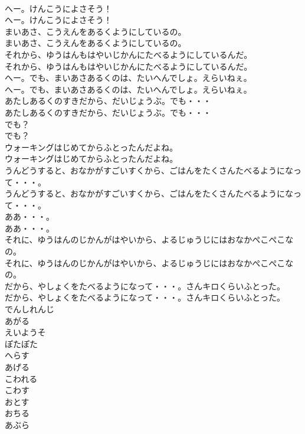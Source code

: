 \documentclass[8pt]{extreport}
\begin{document}
\begin{CJK}{UTF8}{min}
\\	へー。けんこうによさそう！	
\\	へー。けんこうによさそう！ 
\\	まいあさ、こうえんをあるくようにしているの。	
\\	まいあさ、こうえんをあるくようにしているの。 
\\	それから、ゆうはんもはやいじかんにたべるようにしているんだ。	
\\	それから、ゆうはんもはやいじかんにたべるようにしているんだ。 
\\	へー。でも、まいあさあるくのは、たいへんでしょ。えらいねぇ。	
\\	へー。でも、まいあさあるくのは、たいへんでしょ。えらいねぇ。 
\\	あたしあるくのすきだから、だいじょうぶ。でも・・・	
\\	あたしあるくのすきだから、だいじょうぶ。でも・・・ 
\\	でも？	
\\	でも？ 
\\	ウォーキングはじめてからふとったんだよね。	
\\	ウォーキングはじめてからふとったんだよね。 
\\	うんどうすると、おなかがすごいすくから、ごはんをたくさんたべるようになって・・・。	
\\	うんどうすると、おなかがすごいすくから、ごはんをたくさんたべるようになって・・・。 
\\	ああ・・・。	
\\	ああ・・・。 
\\	それに、ゆうはんのじかんがはやいから、よるじゅうじにはおなかぺこぺこなの。	
\\	それに、ゆうはんのじかんがはやいから、よるじゅうじにはおなかぺこぺこなの。 
\\	だから、やしょくをたべるようになって・・・。さんキロくらいふとった。	
\\	だから、やしょくをたべるようになって・・・。さんキロくらいふとった。 
\\	でんしれんじ
\\	あがる
\\	えいようそ
\\	ぽたぽた
\\	へらす
\\	あげる
\\	こわれる
\\	こわす
\\	おとす
\\	おちる
\\	あぶら

\end{CJK}
\end{document}
